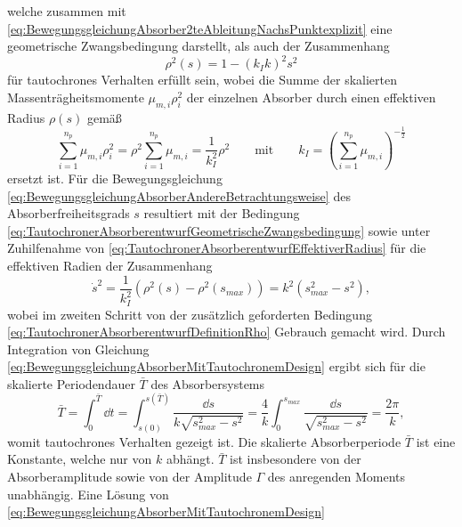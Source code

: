 welche zusammen mit \eqref{eq:BewegungsgleichungAbsorber2teAbleitungNachsPunktexplizit} eine geometrische Zwangsbedingung darstellt,
%
%
als auch der Zusammenhang
\begin{equation}
		\rho^2(s) = 1 - \left(k_I k\right)^2 s^2
		\label{eq:TautochronerAbsorberentwurfDefinitionRho}
\end{equation}
für tautochrones Verhalten  erfüllt sein, wobei die Summe der skalierten Massenträgheitsmomente $\mu_{m,i} \rho_i^2$ der einzelnen Absorber durch einen effektiven Radius $\rho(s)$ gemäß
\begin{equation}
		\sum_{i=1}^{n_p} {  \mu_{m,i} \rho_i^2   } = \rho^2 \sum_{i=1}^{n_p} {\mu_{m,i}} = \frac{1}{k_I^2} \rho^2 \qquad 
		\text{mit} \qquad k_I = \left( \sum_{i=1}^{n_p} {\mu_{m,i}} \right)^{-\frac{1}{2}}
		\label{eq:TautochronerAbsorberentwurfEffektiverRadius}
\end{equation}
ersetzt ist.
%
%
%
%
%
%
%
%
%
%
%
%
%
%
%
Für die Bewegungsgleichung \eqref{eq:BewegungsgleichungAbsorberAndereBetrachtungsweise} 
des Absorberfreiheitsgrads $s$ resultiert mit der Bedingung \eqref{eq:TautochronerAbsorberentwurfGeometrischeZwangsbedingung} 
sowie unter Zuhilfenahme von 	\eqref{eq:TautochronerAbsorberentwurfEffektiverRadius} für die effektiven Radien der Zusammenhang
\begin{equation}
		\dot{s}^2 = \frac{1}{k_I^2} \left( \rho^2(s) - \rho^2(s_{max}) \right) =  k^2  \left( s_{max}^2 - s^2 \right),
		\label{eq:BewegungsgleichungAbsorberMitTautochronemDesign}
\end{equation}
wobei im zweiten Schritt von der zusätzlich geforderten Bedingung \eqref{eq:TautochronerAbsorberentwurfDefinitionRho} Gebrauch gemacht wird. Durch Integration von Gleichung \eqref{eq:BewegungsgleichungAbsorberMitTautochronemDesign} ergibt sich für die skalierte Periodendauer $\bar{T}$ des Absorbersystems
\begin{equation}
		\bar{T} =   \int_{0}^{\bar{T}} { \dd t} =   \int_{s(0)}^{s(\bar{T})} {\frac{  \dd s}{k \sqrt{s_{max}^2 - s^2}}} = \frac{4}{k} \int_{0}^{s_{max}} {\frac{ \dd s}{\sqrt{s_{max}^2 - s^2}} } = \frac{2\pi}{k},
		\label{eq:PeriodendauerAbsorberOhneMistuning}
\end{equation}   
womit tautochrones Verhalten gezeigt ist. Die skalierte Absorberperiode $\bar{T}$ ist eine Konstante, 
welche nur von $k$ abhängt. 
$\bar{T}$  ist insbesondere von der Absorberamplitude sowie von der 
Amplitude $\Gamma$ des anregenden Moments unabhängig. 
Eine Lösung von \eqref{eq:BewegungsgleichungAbsorberMitTautochronemDesign} 
